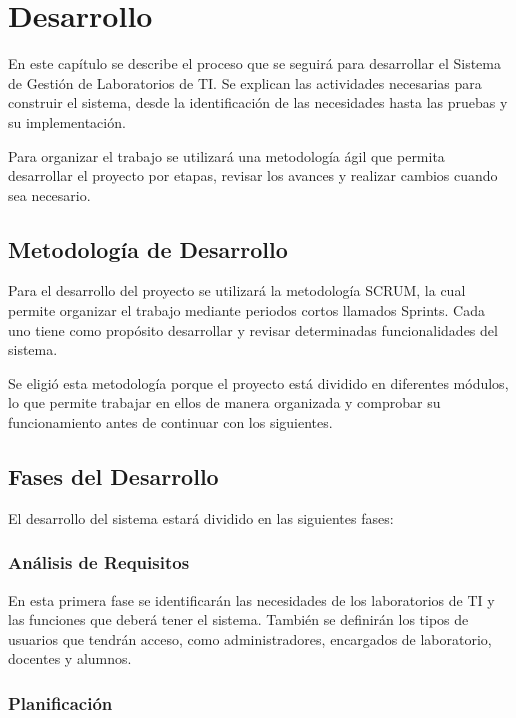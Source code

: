 
\chapter{Desarrollo}

En este capítulo se describe el proceso que se seguirá para desarrollar el Sistema de Gestión de Laboratorios de TI. Se explican las actividades necesarias para construir el sistema, desde la identificación de las necesidades hasta las pruebas y su implementación.

Para organizar el trabajo se utilizará una metodología ágil que permita desarrollar el proyecto por etapas, revisar los avances y realizar cambios cuando sea necesario.

\section{Metodología de Desarrollo}

Para el desarrollo del proyecto se utilizará la metodología SCRUM, la cual permite organizar el trabajo mediante periodos cortos llamados Sprints. Cada uno tiene como propósito desarrollar y revisar determinadas funcionalidades del sistema.

Se eligió esta metodología porque el proyecto está dividido en diferentes módulos, lo que permite trabajar en ellos de manera organizada y comprobar su funcionamiento antes de continuar con los siguientes.

\section{Fases del Desarrollo}

El desarrollo del sistema estará dividido en las siguientes fases:

\subsection{Análisis de Requisitos}

En esta primera fase se identificarán las necesidades de los laboratorios de TI y las funciones que deberá tener el sistema. También se definirán los tipos de usuarios que tendrán acceso, como administradores, encargados de laboratorio, docentes y alumnos.

\subsection{Planificación}

